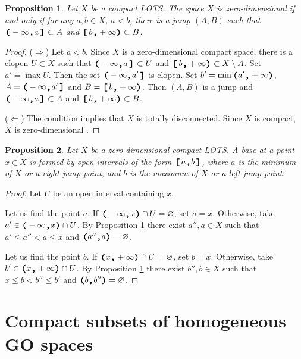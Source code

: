 \documentclass[preprint]{elsarticle}
\def\es{\varnothing}
\newtheorem{proposition}{Proposition}[section]
\theoremstyle{definition}
\theoremstyle{remark}
\def\rarr{\Rightarrow}
\def\larr{\Leftarrow}
\def\ilcomma/{\boldsymbol{,}}
\def\ilsymlp{\boldsymbol{(}}
\def\ilsymrp{\boldsymbol{)}}
\def\ilsymlc{\boldsymbol{[}}
\def\ilsymrc{\boldsymbol{]}}
\def\ilfont#1{\boldsymbol{#1}}
\def\ilfontX#1{\mathrm{\text{\texttt{\textbf{\large #1}}}}}
\def\ilfontX#1{{\text{\texttt{\textbf{\large \upshape #1}}}}}
\def\ilfont#1{\raisebox{-1.2pt}{\ilfontX{#1}}}
\def\ilfontC#1{\raisebox{-0.7pt}{\ilfontX{#1}}}
\def\ilcomma/{\ilfontC{,}}
\def\ilsymlp{\ilfont{(}}
\def\ilsymrp{\ilfont{)}}
\def\ilsymlc{\ilfont{[}\,}
\def\ilsymrc{\,\ilfont{]}}
\def\ilpp(#1,#2){\ilsymlp#1\ilcomma/ #2\ilsymrp}
\def\ilcp[#1,#2){\ilsymlc#1\ilcomma/ #2\ilsymrp}
\def\ilpc(#1,#2]{\ilsymlp#1\ilcomma/ #2\ilsymrc}
\def\ilcc[#1,#2]{\ilsymlc#1\ilcomma/ #2\ilsymrc}
\begin{document}
\begin{proposition}\label{p:1+5}
Let $X$ be a compact LOTS.
The space $X$ is zero-dimensional if and only if for any $a,b\in X$, $a<b$, there is a jump $(A,B)$ such that $\ilpc(-\infty,a]\subset A$ and $\ilcp[b,+\infty)\subset B$.
\end{proposition}
\begin{proof}
($\rarr$) Let $a<b$. Since $X$ is a zero-dimensional compact space, there is a clopen $U\subset X$ such that $\ilpc(-\infty,a]\subset U$ and $\ilcp[b,+\infty)\subset X\setminus A$. Set $a'=\max U$. Then the set $\ilpc(-\infty,a']$ is clopen.
Set $b'=\min \ilpp(a',+\infty)$, $A=\ilpc(-\infty,a']$ and $B=\ilcp[b,+\infty)$.
Then $(A,B)$ is a jump and $\ilpc(-\infty,a]\subset A$ and $\ilcp[b,+\infty)\subset B$.

($\larr$) The condition implies that $X$ is totally disconnected. Since $X$ is compact, $X$ is zero-dimensional \cite[Theorem 6.2.9]{EngelkingBookRu}.
\end{proof}



\begin{proposition}\label{p:1+6}
Let $X$ be a zero-dimensional compact LOTS. A base at a point $x\in X$ is formed by open intervals of the form $\ilcc[a,b]$, where $a$ is the minimum of $X$ or a right jump point, and $b$ is the maximum of $X$ or a left jump point.
\end{proposition}
\begin{proof}
Let $U$ be an open interval containing $x$.

Let us find the point $a$.
If $\ilpp(-\infty,x)\cap U=\es$, set $a=x$. Otherwise, take $a'\in \ilpp(-\infty,x)\cap U$. By Proposition \ref{p:1+5} there exist $a'',a\in X$ such that $a'\leq a''<a\leq x$ and $\ilpp(a'',a)=\es$.

Let us find the point $b$.
If $\ilpp(x,+\infty)\cap U=\es$, set $b=x$. Otherwise, take $b'\in \ilpp(x,+\infty)\cap U$. By Proposition \ref{p:1+5} there exist $b'',b\in X$ such that $x\leq b<b''\leq b'$ and $\ilpp(b,b'')=\es$.
\end{proof}









\section{Compact subsets of homogeneous GO spaces} \label{sec:hcomp}
\end{document}
